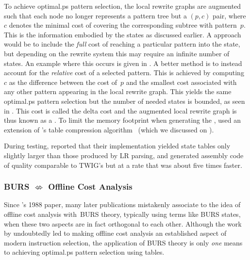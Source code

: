 {To achieve \gls{optimal.ps} \gls{pattern selection}, the \glspl{local
  rewrite graph} are augmented such that each \gls{node} no longer represents a
\gls{pattern tree} but a \mbox{$(p, c)$} pair, where $c$ denotes the minimal
cost of covering the corresponding \gls{subtree} with \gls{pattern}~$p$.
%
This is
the information embodied by the \glspl{state} as discussed earlier.
%
A \naive
approach would be to include the \emph{full} cost of reaching a particular
\gls{pattern} into the \gls{state}, but depending on the rewrite system this may
require an infinite number of \glspl{state}.
%
An example where this occurs is
given in .
%
A better method is to
instead account for the \emph{relative} cost of a selected \gls{pattern}.
%
This
is achieved by computing~$c$ as the difference between the cost of~$p$ and the
smallest cost associated with any other \gls{pattern} appearing in the
\gls{local rewrite graph}.
%
This yields the same \gls{optimal.ps}
\gls{pattern selection} but the number of needed \glspl{state} is bounded, as
seen in .
%
This cost is called the
\gls{delta cost} and the augmented \gls{local rewrite graph} is thus known as a
\tDeltaLRGraph.
%
To limit the memory footprint when generating the
\tDeltaLRGraphs, \citeauthor{Pelegri-Llopart1988} used an extension of
\citeauthor{Chase1987}'s table compression algorithm~\cite{Chase1987} (which we
discussed on ).

During testing, \citeauthor{Pelegri-Llopart1988} reported that their
implementation yielded \gls{state} tables only slightly larger than those
produced by \gls{LR parsing}, and generated \gls{assembly code} of quality
comparable to \gls{TWIG}'s but at a rate that was about five times faster.



\subsubsection{BURS $\nLeftrightarrow$ Offline Cost Analysis}

Since \citeauthor{Pelegri-Llopart1988}'s 1988 paper, many later publications
mistakenly associate to the idea of \gls{offline cost analysis} with~\gls{BURS}
theory, typically using terms like \glspl{BURS state}, when these two aspects
are in fact orthogonal to each other.
%
Although the work by
\citeauthor{Pelegri-Llopart1988} undoubtedly led to making \gls{offline cost
  analysis} an established aspect of modern \gls{instruction selection}, the
application of \gls{BURS} theory is only \emph{one} means to achieving
\gls{optimal.ps} \gls{pattern selection} using tables.

}
